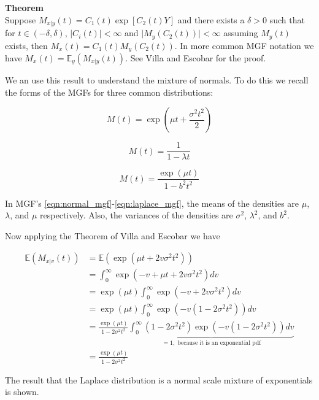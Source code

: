 \noindent \textbf{Theorem}\\

Suppose $M_{x\vert y}(t)=C_1(t)\exp[C_2(t)Y]$ and there exists a $\delta>0$ such that for $t\in(-\delta, \delta)$, $\vert C_i(t) \vert < \infty$  and $\vert M_y(C_2(t))\vert < \infty$ assuming $M_y(t)$ exists, then $M_x(t) =C_1(t)M_y(C_2(t))$. In more common MGF notation we have $M_x(t) = \mathbb{E}_y(M_{x\vert y}(t))$. 
See Villa and Escobar for the proof. 

We an use this result to understand the mixture of normals. To do this we recall the forms of the MGFs for three common distributions: 

\begin{equation}\label{eqn:normal_mgf}
M(t) = \exp\left(\mu t + \frac{\sigma^2t^2}{2}\right)
\end{equation}

\begin{equation}\label{eqn:exponential_mgf}
M(t) =\frac{1}{1-\lambda t}
\end{equation}

\begin{equation}\label{eqn:laplace_mgf}
M(t) = \frac{ \exp\left(\mu t\right) }{1-b^2t^2}
\end{equation}

In MGF's \ref{eqn:normal_mgf}-\ref{eqn:laplace_mgf}, the means of the densities are $\mu$, $\lambda$, and $\mu$ respectively. Also, the variances of the densities are $\sigma^2$, $\lambda^2$, and $b^2$.  

Now applying the Theorem of Villa and Escobar we have 

\begin{align*}
\mathbb{E}\left(M_{x\vert v}(t)\right)&=\mathbb{E}\left(\exp\left(\mu t +2v\sigma^2t^2  \right)\right) \\
&= \int_0^\infty \exp\left(-v +\mu t +2v\sigma^2t^2  \right)dv\\
&= \exp(\mu t) \int_0^\infty \exp\left(-v +2v\sigma^2t^2  \right)dv\\
&= \exp(\mu t) \int_0^\infty \exp\left(-v(1-2\sigma^2t^2)\right)dv\\
&= \frac{\exp(\mu t) }{1-2\sigma^2t^2} \underbrace{\int_0^\infty(1-2\sigma^2t^2)\exp\left(-v(1-2\sigma^2t^2)\right)dv}_{=1, \text{  because it is an exponential pdf}}\\
&= \frac{\exp(\mu t) }{1-2\sigma^2t^2}
\end{align*}

The result that the Laplace distribution is a normal scale mixture of exponentials is shown. 
